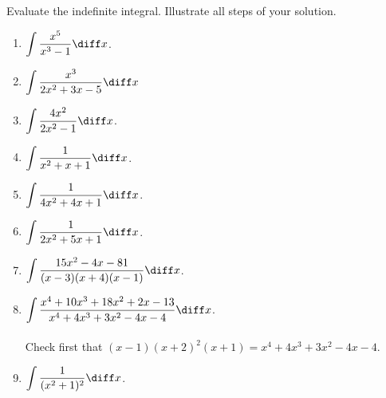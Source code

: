 Evaluate the indefinite integral. Illustrate all steps of your solution. 
\begin{multicols}{2}
\begin{enumerate}[ref={\fcProblemRef}]
\item $\displaystyle \int \frac{x^5 }{x^3-1}\diff x$.

\item $\displaystyle\int \frac{x^3 }{2x^2+3x-5}\diff x$ 

\item $\displaystyle\int \frac{4x^2 }{2x^2-1}\diff x$.

\item $\displaystyle\int \frac{1}{x^2+x+1}\diff x$.

\item $\displaystyle\int \frac{1}{4x^2+4x+1}\diff x$.

\item $\displaystyle\int \frac{1}{2x^2+5x+1}\diff x$.

\item $\displaystyle\int \frac{15x^2-4x-81}{ (x-3)(x +4)(x-1)}\diff x$.

\item $\displaystyle \int \frac {x^{4}+10x^{3}+ 18x^{2}+2x- 13}{x^{4} +4x^{3} +3x^{2}- 4x-4} \diff x$. 
\\~\\

Check first that $(x-1)(x+2)^2(x+1)= x^{4}+4x^{3}+3x^{2}-4x-4$. 

\item $\displaystyle \int \frac{1}{(x^2+1)^2}\diff x$.

\end{enumerate}
\end{multicols}